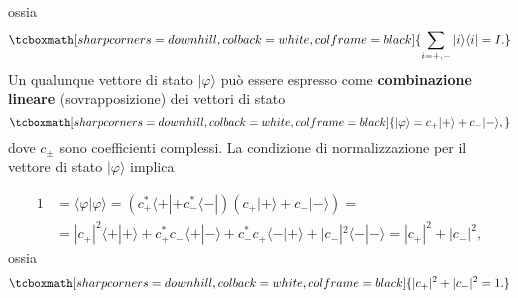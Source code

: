 \documentclass[a4paper,12pt,oneside]{book}
\begin{document}
ossia
	\begin{equation}
		\tcboxmath[sharp corners=downhill, colback=white, colframe=black]{
			\sum \limits_{i=+,-} | i \rangle \langle i | = I .
			}
	\end{equation}
Un qualunque vettore di stato $| \varphi \rangle $ può essere espresso come \textbf{combinazione lineare} (sovrapposizione) dei vettori di stato
	\begin{equation}
		\tcboxmath[sharp corners=downhill, colback=white, colframe=black]{
			| \varphi \rangle = c_+ | + \rangle + c_- | - \rangle ,
			}
	\end{equation}
dove $c_{\pm}$ sono coefficienti complessi. La condizione di normalizzazione per il vettore di stato $ | \varphi \rangle $ implica

	\begin{equation}
		\begin{aligned}
			1 & =\langle \varphi | \varphi \rangle = (c^*_+\langle + | +c^*_- \langle - |)(c_+| + \rangle +c_- | - \rangle)=\\
			&=| c_+|^2\langle + | + \rangle +c^*_+c_- \langle + | - \rangle +c^*_-c_+ \langle - | + \rangle +|c_-|^2 \langle - | - \rangle =|c_+|^2+|c_-|^2 ,
				\end{aligned} 
	\end{equation}
ossia 
	\begin{equation}
		\tcboxmath[sharp corners=downhill, colback=white, colframe=black]{
			|c_+|^2+|c_-|^2=1 .
			}
	\end{equation}
\end{document}
